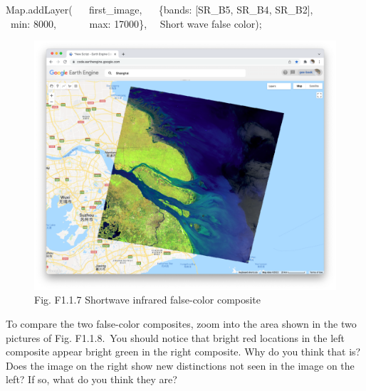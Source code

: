 \documentclass[
  letterpaper,
  DIV=11,
  numbers=noendperiod]{scrreprt}
\newenvironment{Shaded}{\begin{snugshade}}{\end{snugshade}}
\newcommand{\BuiltInTok}[1]{\textcolor[rgb]{0.00,0.23,0.31}{#1}}
\newcommand{\DataTypeTok}[1]{\textcolor[rgb]{0.68,0.00,0.00}{#1}}
\newcommand{\DecValTok}[1]{\textcolor[rgb]{0.68,0.00,0.00}{#1}}
\newcommand{\FunctionTok}[1]{\textcolor[rgb]{0.28,0.35,0.67}{#1}}
\newcommand{\NormalTok}[1]{\textcolor[rgb]{0.00,0.23,0.31}{#1}}
\newcommand{\OperatorTok}[1]{\textcolor[rgb]{0.37,0.37,0.37}{#1}}
\newcommand{\StringTok}[1]{\textcolor[rgb]{0.13,0.47,0.30}{#1}}
\begin{document}
\begin{Shaded}
\begin{Highlighting}[]
\BuiltInTok{Map}\OperatorTok{.}\FunctionTok{addLayer}\NormalTok{(  }
\NormalTok{   first\_image}\OperatorTok{,}  
\NormalTok{   \{}\DataTypeTok{bands}\OperatorTok{:}\NormalTok{ [}\StringTok{\textquotesingle{}SR\_B5\textquotesingle{}}\OperatorTok{,} \StringTok{\textquotesingle{}SR\_B4\textquotesingle{}}\OperatorTok{,} \StringTok{\textquotesingle{}SR\_B2\textquotesingle{}}\NormalTok{]}\OperatorTok{,}  
      \DataTypeTok{ min}\OperatorTok{:} \DecValTok{8000}\OperatorTok{,}  
      \DataTypeTok{ max}\OperatorTok{:} \DecValTok{17000}\NormalTok{\}}\OperatorTok{,}   \StringTok{\textquotesingle{}Short wave false color\textquotesingle{}}\NormalTok{)}\OperatorTok{;}
\end{Highlighting}
\end{Shaded}

\begin{figure}

{\centering \includegraphics{./F1/image4.png}

}

\caption{Fig. F1.1.7 Shortwave infrared false-color composite}

\end{figure}

To compare the two false-color composites, zoom into the area shown in
the two pictures of Fig. F1.1.8.~You should notice that bright red
locations in the left composite appear bright green in the right
composite. Why do you think that is? Does the image on the right show
new distinctions not seen in the image on the left? If so, what do you
think they are?~
\end{document}
